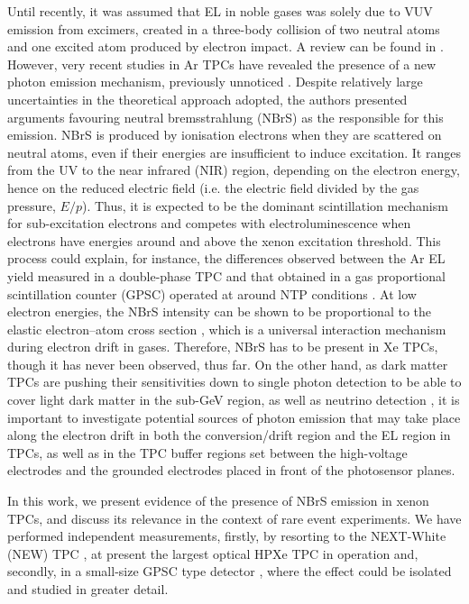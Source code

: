 \documentclass[%
 reprint,
superscriptaddress,
 amsmath,amssymb,
 aps,
]{revtex4-2}
\begin{document}
Until recently, it was assumed that EL in noble gases was solely due to VUV emission from excimers, created in a three-body collision of two neutral atoms and one excited atom produced by electron impact. A review can be found in \cite{33}. However, very recent studies in Ar TPCs have revealed the presence of a new photon emission mechanism, previously unnoticed \cite{34,35,36}. Despite relatively large uncertainties in the theoretical approach adopted, the authors presented arguments favouring neutral bremsstrahlung (NBrS) as the responsible for this emission. NBrS is produced by ionisation electrons when they are scattered on neutral atoms, even if their energies are insufficient to induce excitation. It ranges from the UV to the near infrared (NIR) region, depending on the electron energy, hence on the reduced electric field (i.e. the electric field divided by the gas pressure,  $E/p$). Thus, it is expected to be the dominant scintillation mechanism for sub-excitation electrons and competes with electroluminescence when electrons have energies around and above the xenon excitation threshold. This process could explain, for instance, the differences observed between the Ar EL yield measured in a double-phase TPC \cite{34,35} and that obtained in a gas proportional scintillation counter (GPSC) operated at around NTP conditions \cite{37}. 
At low electron energies, the NBrS intensity can be shown to be proportional to the elastic electron–atom cross section \cite{34}, which is a universal interaction mechanism during electron drift in gases. Therefore, NBrS has to be present in Xe TPCs, though it has never been observed, thus far. On the other hand, as dark matter TPCs are pushing their sensitivities down to single photon detection to be able to cover light dark matter in the sub-GeV region, as well as neutrino detection \cite{12,13,40}, it is important to investigate potential sources of photon emission that may take place along the electron drift in both the conversion/drift region and the EL region in TPCs, as well as in the TPC buffer regions set between the high-voltage electrodes and the grounded electrodes placed in front of the photosensor planes.

In this work, we present evidence of the presence of NBrS emission in xenon TPCs, and discuss its relevance in the context of rare event experiments. We have performed independent measurements, firstly, by resorting to the NEXT-White (NEW) TPC \cite{41}, at present the largest optical HPXe TPC in operation and, secondly, in a small-size GPSC type detector \cite{42,44}, where the effect could be isolated and studied in greater detail.
\end{document}
